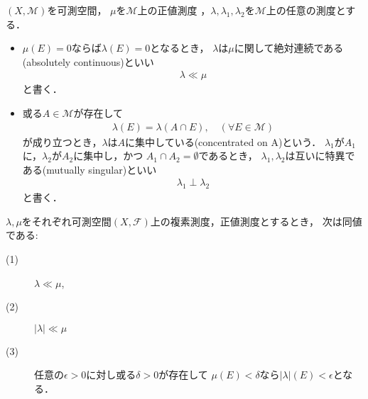 	\begin{screen}
		\begin{dfn}[絶対連続・特異]
			$(X,\mathcal{M})$を可測空間，
			$\mu$を$\mathcal{M}$上の正値測度
			，$\lambda,\lambda_1,\lambda_2$を$\mathcal{M}$上の任意の測度とする．
			\begin{itemize}
				\item $\mu(E)=0$ならば$\lambda(E)=0$となるとき，
					$\lambda$は$\mu$に関して絶対連続である(absolutely continuous)といい
					\begin{align}
						\lambda \ll \mu
					\end{align}
					と書く．
				
				\item 或る$A \in \mathcal{M}$が存在して
					\begin{align}
						\lambda(E) = \lambda(A \cap E),\quad (\forall E \in \mathcal{M})
					\end{align}
					が成り立つとき，$\lambda$は$A$に集中している(concentrated on A)という．
					$\lambda_1$が$A_1$に，$\lambda_2$が$A_2$に集中し，かつ
					$A_1 \cap A_2 = \emptyset$であるとき，
					$\lambda_1,\lambda_2$は互いに特異である(mutually singular)といい
					\begin{align}
						\lambda_1 \perp \lambda_2
					\end{align}
					と書く．
			\end{itemize}
		\end{dfn}
	\end{screen}
	
	\begin{screen}
		\begin{thm}[絶対連続性の同値条件]\label{thm:equivalent_condition_of_absolute_continuity}
			$\lambda,\mu$をそれぞれ可測空間$(X,\mathscr{F})$上の複素測度，正値測度とするとき，
			次は同値である:
			\begin{description}
				\item[(1)] $\lambda \ll \mu$,
				\item[(2)] $|\lambda| \ll \mu$
				\item[(3)] 任意の$\epsilon > 0$に対し或る$\delta > 0$が存在して
					$\mu(E) < \delta$なら$|\lambda|(E) < \epsilon$となる．
			\end{description}
		\end{thm}
	\end{screen}
	
